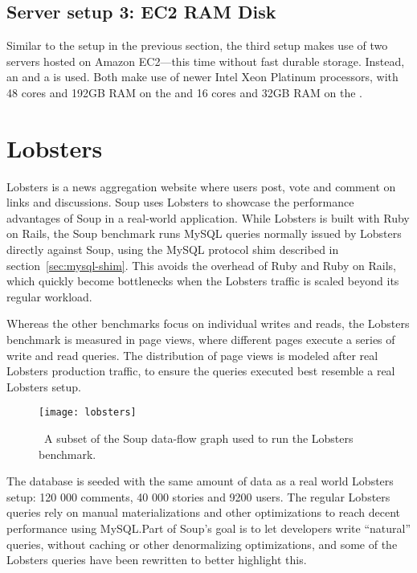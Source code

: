 \subsection{Server setup 3: EC2 RAM Disk}

Similar to the setup in the previous section, the third setup makes use of two
servers hosted on Amazon EC2---this time without fast durable storage. Instead,
an  and a  is used. Both make use of newer
Intel Xeon Platinum processors, with 48 cores and 192GB RAM on the  and
16 cores and 32GB RAM on the .

\section{Lobsters}


Lobsters is a news aggregation website where users post,
vote and comment on links and discussions. Soup uses Lobsters to showcase the
performance advantages of Soup in a real-world application. While Lobsters is
built with Ruby on Rails, the Soup benchmark runs MySQL queries normally issued
by Lobsters directly against Soup, using the MySQL protocol shim described in
section~\ref{sec:mysql-shim}. This avoids the overhead of Ruby and Ruby on
Rails, which quickly become bottlenecks when the Lobsters traffic is scaled
beyond its regular workload.

Whereas the other benchmarks focus on individual writes and reads, the Lobsters
benchmark is measured in page views, where different pages execute a series of
write and read queries. The distribution of page views is modeled after real
Lobsters production traffic, to ensure the queries executed best resemble a real
Lobsters setup.

\begin{figure}[H]
  \centering
  \texttt{[image: lobsters]}
  \caption{\
    A subset of the Soup data-flow graph used to run the Lobsters benchmark.
  }\label{fig:lobsters-graph}
\end{figure}

The database is seeded with the same amount of data as a real world Lobsters
setup: 120 000 comments, 40 000 stories and 9200 users. The regular Lobsters
queries rely on manual materializations and other optimizations to reach decent
performance using MySQL.\@ Part of Soup's goal is to let developers write
``natural'' queries, without caching or other denormalizing optimizations, and
some of the Lobsters queries have been rewritten to better highlight this.

